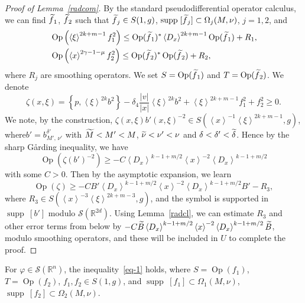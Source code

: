 \documentclass[AHL,Unicode,longabstracts,published]{cedram}
\renewcommand*\c{\gamma}
\renewcommand*\d{\delta}
\newcommand*\f{\varphi}
\newcommand*\m{\mu}
\newcommand*\n{\nu}
\newcommand*\x{\xi}
\newcommand*\z{\zeta}
\renewcommand{\O}{\Omega}
\DeclareMathOperator{\Op}{Op}
\newcommand*\re{\mathbb{R}}
\newcommand{\clS}{\mathcal{S}}
\DeclareMathOperator{\supp}{supp\;}
\newcommand{\jap}[1]{\left\langle #1 \right\rangle}
\let\oldtilde\tilde
\renewcommand*{\tilde}[1]{\mathchoice{\widetilde{#1}}{\widetilde{#1}}{\oldtilde{#1}}{\oldtilde{#1}}}
\begin{document}
\begin{proof}[Proof of Lemma~\ref{radcom}]
By the standard pseudodifferential operator calculus, we can find $\tilde f_1$, $\tilde f_2$ such that $\tilde f_j\in S(1,g)$, $\supp[\tilde f_j]\subset \O_j(M,\n)$, $j=1,2$, and
\begin{align*}
&\Op\left(\jap{\x}^{2k+m-1}f_1^2\right)\leq \Op(\tilde f_1)^*\jap{D_x}^{2k+m-1}\Op(\tilde f_1) +R_1, \\
&\Op\left(\jap{x}^{2\c-1-\m}f_2^2\right)\leq \Op(\tilde f_2)^*\Op(\tilde f_2) +R_2,
\end{align*}
where $R_j$ are smoothing operators. We set $S=\Op(\tilde f_1)$ and $T=\Op(\tilde f_2)$. We denote
\[
\z(x,\x)= \left\{p,\jap{\x}^{2k}b^2\right\} - \d_4 \frac{|v|}{|x|} \jap{\x}^{2k}b^2 +\jap{\x}^{2k+m-1}f_1^2 +f_2^2\geq 0.
\]
We note, by the construction, $\z(x,\x) b'(x,\x)^{-2}\in S(\jap{x}^{-1}\jap{\x}^{2k+m-1},g)$, where\linebreak $b'=b_{M',\,\n'}^{\d'}$ with $\tilde M<M'<M$, $\tilde\n<\n'<\n$ and $\d<\d'<\tilde{\d}$. Hence by the sharp G{\aa}rding inequality, we have
\[
\Op\left(\z(b')^{-2}\right)\geq -C\jap{D_x}^{k-1+m/2}\jap{x}^{-2}\jap{D_x}^{k-1+m/2}
\]
with some $C>0$. Then by the asymptotic expansion, we learn
\[
\Op(\z) \geq -CB' \jap{D_x}^{k-1+m/2}\jap{x}^{-2}\jap{D_x}^{k-1+m/2} B' -R_3,
\]
where $R_3\in S(\jap{x}^{-3}\jap{\x}^{2k+m-3},g)$, and the symbol is supported in $\supp[b']$ modulo $\clS(\re^{2d})$. Using Lemma~\ref{radcl}, we can estimate $R_3$ and other error terms from below by $-C\tilde B \jap{D_x}^{k-1+m/2}\jap{x}^{-2}\jap{D_x}^{k-1+m/2}\tilde B$, modulo smoothing operators, and these will be included in $U$ to complete the proof.
\end{proof}

\begin{lemm}\label{radres}
For $\f\in \clS(\re^n)$, the inequality~\eqref{eq-1} holds, where $S=\Op(f_1)$, $T=\Op(f_2)$, $f_1, f_2\in S(1,g)$, and $\supp[f_1]\subset \O_1(M,\n)$, $\supp[f_2]\subset \O_2(M,\n)$.
\end{lemm}
\end{document}

